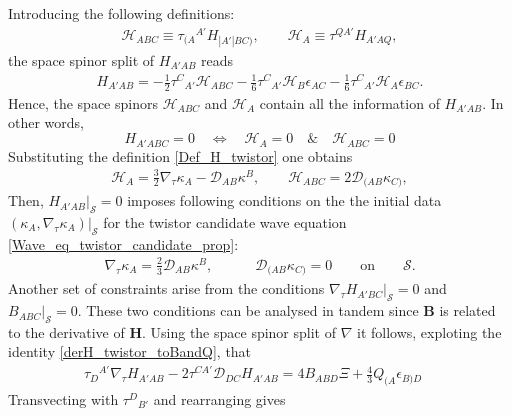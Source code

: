 \documentclass[10pt,a4paper]{article}
\theoremstyle{plain}
\def\bmB{{\bm B}}
\def\bmH{{\bm H}}
\begin{document}
{\medskip

Introducing the following definitions:
\begin{align}
  \mathcal{H} _{ABC}  \equiv \tau _{(A}{}^{A'}H_{|A'|BC)}, \qquad
  \mathcal{H}_{A}  \equiv  \tau^{QA'} H_{A'AQ},
\end{align}
the space spinor split of $H_{A'AB}$ reads
\begin{align}
  H_{A'AB} = - \tfrac{1}{2} \tau ^{C}{}_{A'} \mathcal{H} _{ABC}  -
  \tfrac{1}{6} \tau ^{C}{}_{A'} \mathcal{H} _{B} \epsilon _{AC}  -
  \tfrac{1}{6} \tau ^{C}{}_{A'} \mathcal{H} _{A} \epsilon _{BC}.
\end{align}
Hence, the space spinors $\mathcal{H} _{ABC}$ and $\mathcal{H}_{A}$
contain all the information of $H_{A'AB}$. In other words,
\[
H_{A'ABC}=0 \quad                   %
\iff \quad \mathcal{H} _{A}=0      %
\quad
\& \quad \mathcal{H}_{ABC}=0  %
\]
Substituting the definition \eqref{Def_H_twistor} one obtains
\begin{align}\label{spacespinordecompHtotwistorders}
\mathcal{H} _{A} = \tfrac{3}{2} \nabla_\tau \kappa_{A} - \mathcal{D} _{AB}\kappa^{B}, \qquad \mathcal{H} _{ABC} = 2 \mathcal{D} _{(AB}\kappa _{C)},
\end{align}
Then, $H_{A'AB}|_{\mathcal{S}}=0$  imposes
following conditions on the
the initial data
$(\kappa_A,\nabla_\tau\kappa_A)|_{\mathcal{S}}$
for the twistor candidate wave equation
\eqref{Wave_eq_twistor_candidate_prop}:
\begin{align}\label{H_twistor_vanishes_ID}
 \nabla_\tau \kappa _{A} = \tfrac{2}{3} \mathcal{D} _{AB}\kappa ^{B}, \qquad
 \quad \mathcal{D} _{(AB}\kappa _{C)}=0 \qquad \text{on} \qquad \mathcal{S}.
\end{align}
Another set of constraints arise from the conditions $\nabla_\tau
H_{A'BC}|_{\mathcal{S}}=0$ and $B_{ABC}|_{\mathcal{S}}=0$. These two
conditions can be analysed in tandem since $\bmB$ is related to the
derivative of $\bmH$. Using the space spinor split of $\nabla$ it
follows, exploting the identity \eqref{derH_twistor_toBandQ}, that
\begin{align}
  \tau _{D}{}^{A'}\nabla_\tau H_{A'AB} -2 \tau ^{CA'} \mathcal{D}
  _{DC}H_{A'AB} = 4 B_{ABD} \Xi + \tfrac{4}{3} Q_{(A}\epsilon
  _{B)D}\quad
\end{align}
Transvecting with $\tau^{D}{}_{B'}$ and rearranging gives
\begin{align}

\end{align}}
\end{document}
